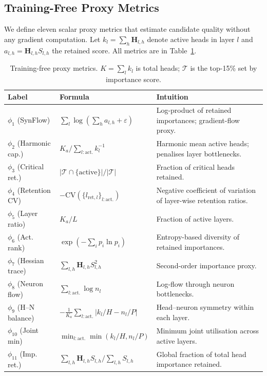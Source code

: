 \documentclass{article}
\newcommand{\Hb}{\mathbf{H}}
\begin{document}
\subsection{Training-Free Proxy Metrics}
\label{sec:proxies}

We define eleven scalar proxy metrics that estimate candidate quality
without any gradient computation.  Let $k_l = \sum_h \Hb_{l,h}$
denote active heads in layer $l$ and $a_{l,h}=\Hb_{l,h}S_{l,h}$ the
retained score.  All metrics are in Table~\ref{tab:proxies}.

\begin{table}[t]
\centering
\caption{Training-free proxy metrics.  $K=\sum_l k_l$ is total heads;
  $\mathcal{T}$ is the top-15\% set by importance score.}
\label{tab:proxies}
\small
\setlength{\tabcolsep}{4pt}
\begin{tabular}{@{}llp{6.5cm}@{}}
\toprule
Label & Formula & Intuition\\
\midrule
$\phi_1$ (SynFlow) &
  $\sum_l \log(\sum_h a_{l,h}+\varepsilon)$ &
  Log-product of retained importances; gradient-flow proxy.\\
$\phi_2$ (Harmonic cap.) &
  $K_a/\sum_{l:\mathrm{act.}} k_l^{-1}$ &
  Harmonic mean active heads; penalises layer bottlenecks.\\
$\phi_3$ (Critical ret.) &
  $|\mathcal{T}\cap\{\text{active}\}|/|\mathcal{T}|$ &
  Fraction of critical heads retained.\\
$\phi_4$ (Retention CV) &
  $-\mathrm{CV}(\{l_{\mathrm{ret},l}\}_{l:\mathrm{act.}})$ &
  Negative coefficient of variation of layer-wise retention ratios.\\
$\phi_5$ (Layer ratio) &
  $K_a/L$ &
  Fraction of active layers.\\
$\phi_6$ (Act. rank) &
  $\exp(-\sum_i p_i \ln p_i)$ &
  Entropy-based diversity of retained importances.\\
$\phi_7$ (Hessian trace) &
  $\sum_{l,h}\Hb_{l,h}S_{l,h}^{2}$ &
  Second-order importance proxy.\\
$\phi_8$ (Neuron flow) &
  $\sum_{l:\mathrm{act.}}\log n_l$ &
  Log-flow through neuron bottlenecks.\\
$\phi_9$ (H--N balance) &
  $-\frac{1}{K_a}\sum_{l:\mathrm{act.}}|k_l/H - n_l/P|$ &
  Head--neuron symmetry within each layer.\\
$\phi_{10}$ (Joint min) &
  $\min_{l:\mathrm{act.}}\min(k_l/H, n_l/P)$ &
  Minimum joint utilisation across active layers.\\
$\phi_{11}$ (Imp. ret.) &
  $\sum_{l,h}\Hb_{l,h}S_{l,h}/\sum_{l,h}S_{l,h}$ &
  Global fraction of total head importance retained.\\
\bottomrule
\end{tabular}
\end{table}
\end{document}
